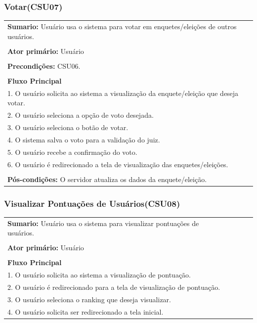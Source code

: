 \documentclass[a4paper,12pt]{report}
\begin{document}
\begin{center}
	{\subsubsection*{Votar(CSU07)}}
\end{center}
\markright{}
\begin{tabularx}{\textwidth}{|X|}\hline
	{\textbf{Sumario:}} Usuário usa o sistema para votar em enquetes/eleições de outros usuários.\ \ \ \ \ \ \ \ \ \ \ \ \ \\\\
	{\textbf{Ator primário:}} Usuário \\\\
	{\textbf{Precondições:}} CSU06.\\\\
	{\textbf{Fluxo Principal}}\\
	1. O usuário solicita ao sistema a visualização da enquete/eleição que deseja votar.\\
	2. O usuário seleciona a opção de voto desejada.\\
	3. O usuário seleciona o botão de votar.\\
	4. O sistema salva o voto para a validação do juiz.\\
	5. O usuário recebe a confirmação do voto.\\
	6. O usuário é redirecionado a tela de visualização das enquetes/eleições.\\\\
	{\textbf{Pós-condições:}} O servidor atualiza os dados da enquete/eleição.\\
	\hline
\end{tabularx}

\begin{center}
	{\subsubsection*{Visualizar Pontuações de Usuários(CSU08)}}
\end{center}
\markright{}
\begin{tabularx}{\textwidth}{|X|}\hline
	{\textbf{Sumario:}} Usuário usa o sistema para visualizar pontuações de usuários.\ \ \ \ \ \ \ \ \ \ \ \ \ \ \ \ \ \ \ \ \ \ \ \ \ \ \ \ \ \ \ \ \ \\\\
	{\textbf{Ator primário:}} Usuário \\\\
	{\textbf{Fluxo Principal}}\\
	1. O usuário solicita ao sistema a visualização de pontuação.\\
	2. O usuário é redirecionado para a tela de visualização de pontuação. \\
	3. O usuário seleciona o ranking que deseja visualizar. \\
	4. O usuário solicita ser redirecionado a tela inicial.\\
	\hline
\end{tabularx}
\end{document}
